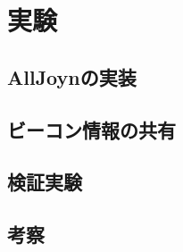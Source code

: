 \chapter{実験}
\label{chap:poordirection}


\section{AllJoynの実装}

\section{ビーコン情報の共有}

\section{検証実験}

\section{考察}
